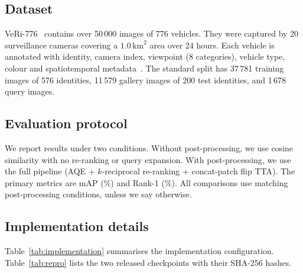 \subsection{Dataset}
VeRi-776~\cite{liu2016veri,liu2018provid} contains over 50\,000 images of 776 vehicles. They were captured by 20 surveillance cameras covering a $1.0\,\text{km}^{2}$ area over 24 hours. Each vehicle is annotated with identity, camera index, viewpoint (8 categories), vehicle type, colour and spatiotemporal metadata~\cite{liu2018provid}. The standard split has 37\,781 training images of 576 identities, 11\,579 gallery images of 200 test identities, and 1\,678 query images.

\subsection{Evaluation protocol}
We report results under two conditions. Without post-processing, we use cosine similarity with no re-ranking or query expansion. With post-processing, we use the full pipeline (AQE $+$ $k$-reciprocal re-ranking $+$ concat-patch flip TTA). The primary metrics are mAP (\%) and Rank-1 (\%). All comparisons use matching post-processing conditions, unless we say otherwise.

\subsection{Implementation details}
Table~\ref{tab:implementation} summarises the implementation configuration. Table~\ref{tab:repro} lists the two released checkpoints with their SHA-256 hashes.

